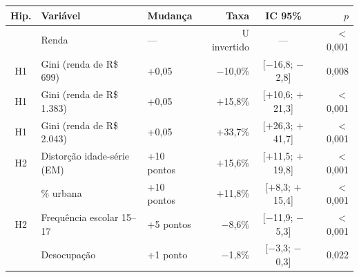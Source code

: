 \begin{tabular}{@{}cllrcr@{}}
\toprule
\textbf{Hip.} & \textbf{Variável} & \textbf{Mudança} & \textbf{Taxa} & \textbf{IC 95\%} & \textbf{$p$}\\
\midrule
 & Renda & --- & U invertido & --- & $<$0,001\\
H1 & Gini (renda de R\$ 699) & +0,05 & $-$10,0\% & [$-$16,8; $-$2,8] & 0,008\\
H1 & Gini (renda de R\$ 1.383) & +0,05 & $+$15,8\% & [$+$10,6; $+$21,3] & $<$0,001\\
H1 & Gini (renda de R\$ 2.043) & +0,05 & $+$33,7\% & [$+$26,3; $+$41,7] & $<$0,001\\
H2 & Distorção idade-série (EM) & +10 pontos & $+$15,6\% & [$+$11,5; $+$19,8] & $<$0,001\\
 & \% urbana & +10 pontos & $+$11,8\% & [$+$8,3; $+$15,4] & $<$0,001\\
H2 & Frequência escolar 15–17 & +5 pontos & $-$8,6\% & [$-$11,9; $-$5,3] & $<$0,001\\
 & Desocupação & +1 ponto & $-$1,8\% & [$-$3,3; $-$0,3] & 0,022\\
\bottomrule
\end{tabular}

